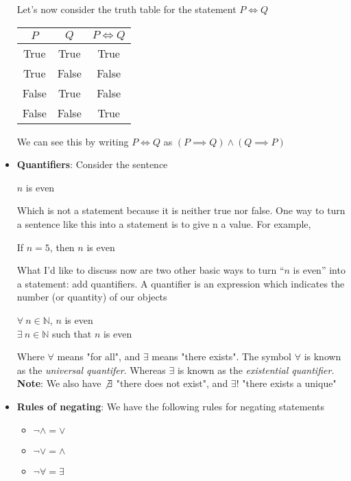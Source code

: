 \documentclass{report}
\begin{document}
\begin{itemize}
        \bigbreak \noindent 
        Let's now consider the truth table for the statement $P \iff Q $
        \begin{center}
            \begin{tabular}{c|c|c}
                $P$& $Q$ & $P\iff Q$ \\
                \hline
                True &True & True \\
                True & False & False \\
                False & True & False \\
                False & False & True
            \end{tabular}
        \end{center}
        We can see this by writing $P\iff Q $ as $(P\implies Q) \land (Q\implies P)$
    \item \textbf{Quantifiers}: Consider the sentence
        \begin{center}
           $n$ is even 
        \end{center}
        Which is not a statement because it is neither true nor false. One way to turn a sentence like this into a statement is to give n a value. For example,
        \begin{center}
           If $n=5$, then $n$ is even 
        \end{center}
        What I’d like to discuss now are two other basic ways to turn “$n$ is even” into a statement: add quantifiers. A quantifier is an expression which indicates the number (or quantity) of our objects
        \begin{center}
          $\forall \ n\in \mathbb{N}$, $n$ is even \\
          $\exists \ n \in \mathbb{N}$ such that $n$ is even
        \end{center}
        Where $\forall$ means "for all", and $\exists$ means "there exists". The symbol $\forall$ is known as the \textit{universal quantifer}. Whereas $\exists$ is known as the \textit{existential quantifier.}
        \bigbreak \noindent 
        \textbf{Note}: We also have $\not\exists $ "there does not exist", and $\exists! $ "there exists a unique"
    \item \textbf{Rules of negating}: We have the following rules for negating statements
        \begin{itemize}
            \item $\neg\land = \lor $ 
            \item $\neg\lor = \land $
            \item $\neg\forall = \exists $ 

\end{itemize}
\end{itemize}
\end{document}
